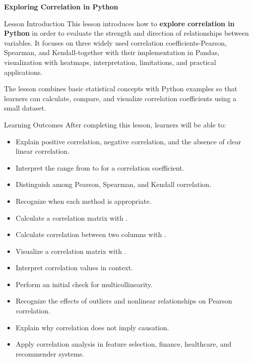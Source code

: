 \documentclass[aspectratio=169,11pt]{beamer}
\begin{document}
\begin{frame}
\centering\vfill
{\Huge\textcolor{TitleBlue}{\textbf{Exploring Correlation in Python}}}
\vfill\end{frame}
\begin{frame}[allowframebreaks]{Lesson Introduction}
\small
This lesson introduces how to \textbf{explore correlation in Python} in order to evaluate the strength and direction of relationships between variables. It focuses on three widely used correlation coefficients-Pearson, Spearman, and Kendall-together with their implementation in Pandas, visualization with heatmaps, interpretation, limitations, and practical applications.\par\medskip
The lesson combines basic statistical concepts with Python examples so that learners can calculate, compare, and visualize correlation coefficients using a small dataset.\par\medskip
\end{frame}
\begin{frame}[allowframebreaks]{Learning Outcomes}
\footnotesize
After completing this lesson, learners will be able to:\par\medskip
\begin{itemize}
\item Explain positive correlation, negative correlation, and the absence of clear linear correlation.
\item Interpret the range from \texttt{} to \texttt{} for a correlation coefficient.
\item Distinguish among Pearson, Spearman, and Kendall correlation.
\item Recognize when each method is appropriate.
\item Calculate a correlation matrix with \texttt{}.
\item Calculate correlation between two columns with \texttt{}.
\item Visualize a correlation matrix with \texttt{}.
\item Interpret correlation values in context.
\item Perform an initial check for multicollinearity.
\item Recognize the effects of outliers and nonlinear relationships on Pearson correlation.
\item Explain why correlation does not imply causation.
\item Apply correlation analysis in feature selection, finance, healthcare, and recommender systems.
\end{itemize}
\end{frame}
\end{document}
